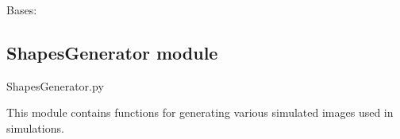 \documentclass[letterpaper,10pt,english]{sphinxmanual}
\begin{document}
\begin{fulllineitems}
\label{\detokenize{source/SSNRCalculator:SSNRCalculator.SSNRWidefield}}
\pysigstartsignatures
\pysiglinewithargsret
{}
{}
{}
\pysigstopsignatures
\sphinxAtStartPar
Bases: {\hyperref[\detokenize{source/SSNRCalculator:SSNRCalculator.SSNRHandler}]{}}


\begin{fulllineitems}
\label{\detokenize{source/SSNRCalculator:SSNRCalculator.SSNRWidefield.compute_ssnr}}
\pysigstartsignatures
\pysiglinewithargsret
{}
{}
{}
\pysigstopsignatures
\end{fulllineitems}


\end{fulllineitems}


\sphinxstepscope


\subsection{ShapesGenerator module}
\label{\detokenize{source/ShapesGenerator:module-ShapesGenerator}}\label{\detokenize{source/ShapesGenerator:shapesgenerator-module}}\label{\detokenize{source/ShapesGenerator::doc}}
\sphinxAtStartPar
ShapesGenerator.py

\sphinxAtStartPar
This module contains functions for generating various simulated images used in simulations.
\end{document}
